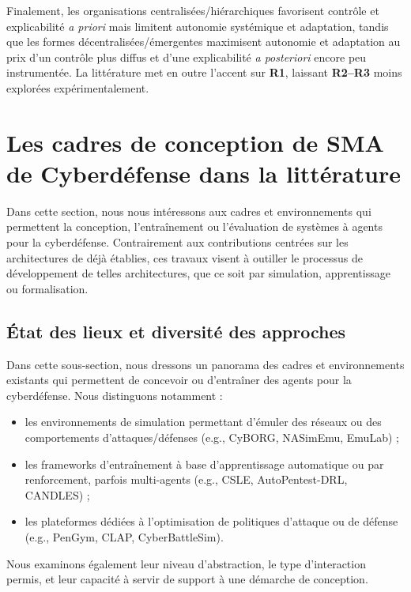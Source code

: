 Finalement, les organisations centralisées/hiérarchiques favorisent contrôle et explicabilité \emph{a priori} mais limitent autonomie systémique et adaptation, tandis que les formes décentralisées/émergentes maximisent autonomie et adaptation au prix d'un contrôle plus diffus et d'une explicabilité \emph{a posteriori} encore peu instrumentée. La littérature met en outre l'accent sur \textbf{R1}, laissant \textbf{R2--R3} moins explorées expérimentalement.



\section{Les cadres de conception de SMA de Cyberdéfense dans la littérature}\label{sec:sma-cyberdefense-conception}

Dans cette section, nous nous intéressons aux cadres et environnements qui permettent la conception, l'entraînement ou l'évaluation de systèmes à agents pour la cyberdéfense. Contrairement aux contributions centrées sur les architectures de  déjà établies, ces travaux visent à outiller le processus de développement de telles architectures, que ce soit par simulation, apprentissage ou formalisation.

\subsection{État des lieux et diversité des approches}

Dans cette sous-section, nous dressons un panorama des cadres et environnements existants qui permettent de concevoir ou d'entraîner des agents pour la cyberdéfense. Nous distinguons notamment :
\begin{itemize}
  \item les environnements de simulation permettant d'émuler des réseaux ou des comportements d'attaques/défenses (e.g., CyBORG, NASimEmu, EmuLab) ;
  \item les frameworks d'entraînement à base d'apprentissage automatique ou par renforcement, parfois multi-agents (e.g., CSLE, \allowbreak AutoPentest-DRL, CANDLES) ;
  \item les plateformes dédiées à l'optimisation de politiques d'attaque ou de défense (e.g., PenGym, CLAP, CyberBattleSim).
\end{itemize}

Nous examinons également leur niveau d'abstraction, le type d'interaction permis, et leur capacité à servir de support à une démarche de conception.

